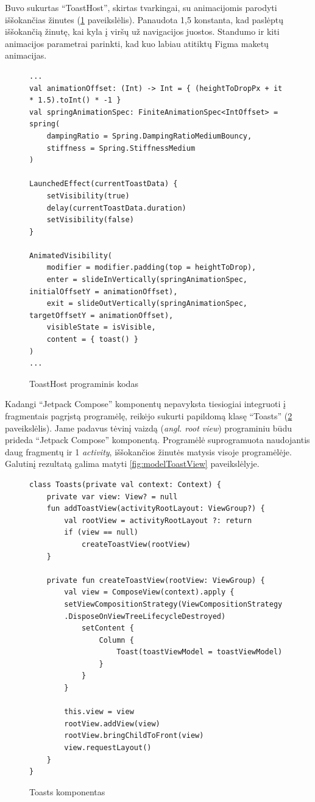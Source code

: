 \newpage
Buvo sukurtas \enquote{ToastHost}, skirtas tvarkingai, su animacijomis parodyti iššokančias žinutes  (\ref{fig:ToastHost} paveikslėlis). Panaudota 1,5 konstanta, kad paslėptų iššokančią žinutę, kai kyla į viršų už navigacijos juostos. Standumo ir kiti animacijos parametrai parinkti, kad kuo labiau atitiktų Figma maketų animacijas.

\begin{figure}[htbp!]
    \centering
    \begin{verbatim}
...
val animationOffset: (Int) -> Int = { (heightToDropPx + it * 1.5).toInt() * -1 }
val springAnimationSpec: FiniteAnimationSpec<IntOffset> = spring(
    dampingRatio = Spring.DampingRatioMediumBouncy,
    stiffness = Spring.StiffnessMedium
)

LaunchedEffect(currentToastData) {
    setVisibility(true)
    delay(currentToastData.duration)
    setVisibility(false)
}

AnimatedVisibility(
    modifier = modifier.padding(top = heightToDrop),
    enter = slideInVertically(springAnimationSpec, initialOffsetY = animationOffset),
    exit = slideOutVertically(springAnimationSpec, targetOffsetY = animationOffset),
    visibleState = isVisible,
    content = { toast() }
)
...
    \end{verbatim}
    \caption{ToastHost programinis kodas}
    \label{fig:ToastHost}
\end{figure}

\newpage
Kadangi \enquote{Jetpack Compose} komponentų nepavyksta tiesiogiai integruoti į fragmentais pagrįstą programėlę, reikėjo sukurti papildomą klasę \enquote{Toasts} (\ref{fig:Toasts} paveikslėlis). Jame padavus tėvinį vaizdą (\emph{angl. root view}) programiniu būdu prideda \enquote{Jetpack Compose} komponentą. Programėlė suprogramuota naudojantis daug fragmentų ir 1 \textit{activity}, iššokančios žinutės matysis visoje programėlėje. Galutinį rezultatą galima matyti \ref{fig:modelToastView} paveikslėlyje.

\begin{figure}[htbp!]
    \centering
    \begin{verbatim}
class Toasts(private val context: Context) {
    private var view: View? = null
    fun addToastView(activityRootLayout: ViewGroup?) {
        val rootView = activityRootLayout ?: return
        if (view == null)
            createToastView(rootView)
    }

    private fun createToastView(rootView: ViewGroup) {
        val view = ComposeView(context).apply {
        setViewCompositionStrategy(ViewCompositionStrategy
        .DisposeOnViewTreeLifecycleDestroyed)
            setContent {
                Column {
                    Toast(toastViewModel = toastViewModel)
                }
            }
        }

        this.view = view
        rootView.addView(view)
        rootView.bringChildToFront(view)
        view.requestLayout()
    }
}
\end{verbatim}
    \caption{Toasts komponentas}
    \label{fig:Toasts}
\end{figure}